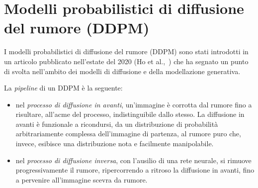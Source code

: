 \section{Modelli probabilistici di diffusione del rumore (DDPM) }


I modelli probabilistici di diffusione del rumore (DDPM) sono stati introdotti in un articolo pubblicato nell'estate del 2020 (Ho et al.,~\cite{ho2020}) 
che ha segnato un punto di svolta nell'ambito dei modelli di diffusione e della modellazione generativa.

\medskip
\noindent La \emph{pipeline} di un DDPM è la seguente:
\begin{itemize}
\item nel \emph{processo di diffusione in avanti}, un'immagine è corrotta dal rumore fino a risultare, all'acme del processo, indistinguibile dallo stesso. 
La diffusione in avanti è funzionale a ricondursi, da un distribuzione di probabilità arbitrariamente complessa dell'immagine di partenza, al rumore puro che, invece, esibisce una distribuzione nota e 
facilmente manipolabile.
\item nel \emph{processo di diffusione inversa}, con l'ausilio di una rete neurale, si rimuove progressivamente il rumore, ripercorrendo a ritroso la diffusione in avanti, fino a pervenire all'immagine scevra da rumore. 
\end{itemize}











